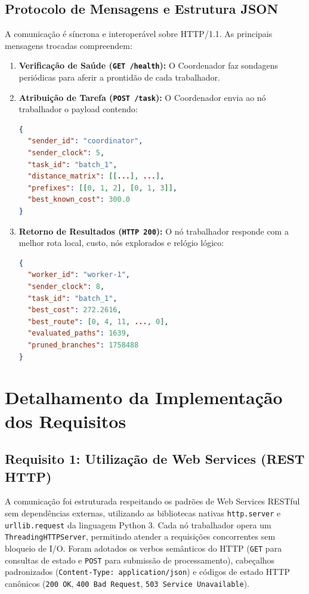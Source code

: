 \documentclass[12pt]{article}
\begin{document}
\subsection{Protocolo de Mensagens e Estrutura JSON}
A comunicação é síncrona e interoperável sobre HTTP/1.1. As principais mensagens trocadas compreendem:
\begin{enumerate}
    \item \textbf{Verificação de Saúde (\texttt{GET /health}):} O Coordenador faz sondagens periódicas para aferir a prontidão de cada trabalhador.
    \item \textbf{Atribuição de Tarefa (\texttt{POST /task}):} O Coordenador envia ao nó trabalhador o payload contendo:
\begin{lstlisting}[language=json]
{
  "sender_id": "coordinator",
  "sender_clock": 5,
  "task_id": "batch_1",
  "distance_matrix": [[...], ...],
  "prefixes": [[0, 1, 2], [0, 1, 3]],
  "best_known_cost": 300.0
}
\end{lstlisting}
    \item \textbf{Retorno de Resultados (\texttt{HTTP 200}):} O nó trabalhador responde com a melhor rota local, custo, nós explorados e relógio lógico:
\begin{lstlisting}[language=json]
{
  "worker_id": "worker-1",
  "sender_clock": 8,
  "task_id": "batch_1",
  "best_cost": 272.2616,
  "best_route": [0, 4, 11, ..., 0],
  "evaluated_paths": 1639,
  "pruned_branches": 1758488
}
\end{lstlisting}
\end{enumerate}

\section{Detalhamento da Implementação dos Requisitos}

\subsection{Requisito 1: Utilização de Web Services (REST HTTP)}
A comunicação foi estruturada respeitando os padrões de Web Services RESTful sem dependências externas, utilizando as bibliotecas nativas \texttt{http.server} e \texttt{urllib.request} da linguagem Python 3. Cada nó trabalhador opera um \texttt{ThreadingHTTPServer}, permitindo atender a requisições concorrentes sem bloqueio de I/O. Foram adotados os verbos semânticos do HTTP (\texttt{GET} para consultas de estado e \texttt{POST} para submissão de processamento), cabeçalhos padronizados (\texttt{Content-Type: application/json}) e códigos de estado HTTP canônicos (\texttt{200 OK}, \texttt{400 Bad Request}, \texttt{503 Service Unavailable}).
\end{document}
